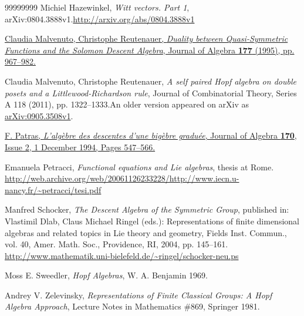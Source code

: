 \documentclass
[numbers=enddot,12pt,final,onecolumn,notitlepage,abstracton]{scrartcl}%
\theoremstyle{definition}
\begin{document}
\begin{thebibliography}{99999999}
Michiel Hazewinkel, \textit{Witt vectors. Part 1},
arXiv:0804.3888v1.\newline\url{http://arxiv.org/abs/0804.3888v1}

%
\href{https://doi.org/10.1006/jabr.1995.1336}{Claudia
Malvenuto, Christophe Reutenauer, \textit{Duality between Quasi-Symmetric
Functions and the Solomon Descent Algebra}, Journal of Algebra \textbf{177}
(1995), pp. 967--982.}

Claudia Malvenuto, Christophe Reutenauer,
\textit{A self paired Hopf algebra on double posets and a
Littlewood-Richardson rule}, Journal of Combinatorial Theory, Series A 118
(2011), pp. 1322--1333.\newline An older version appeared on arXiv as
\href{http://arxiv.org/abs/0905.3508v1}{arXiv:0905.3508v1}.

\href{https://doi.org/10.1006/jabr.1994.1352}{F.
Patras, \textit{L'alg\`{e}bre des descentes d'une big\`{e}bre gradu\'{e}e},
Journal of Algebra \textbf{170}, Issue 2, 1 December 1994, Pages 547--566.}

Emanuela Petracci, \textit{Functional equations and
Lie algebras}, thesis at Rome.\newline%
\url{http://web.archive.org/web/20061126233228/http://www.iecn.u-nancy.fr/~petracci/tesi.pdf}

Manfred Schocker, \textit{The Descent Algebra of
the Symmetric Group}, published in: Vlastimil Dlab, Claus Michael Ringel
(eds.): Representations of finite dimensional algebras and related topics in
Lie theory and geometry, Fields Inst. Commun., vol. 40, Amer. Math. Soc.,
Providence, RI, 2004, pp. 145--161.\newline%
\url{http://www.mathematik.uni-bielefeld.de/~ringel/schocker-neu.ps}

Moss E. Sweedler, \textit{Hopf Algebras}, W. A.
Benjamin 1969.

Andrey V. Zelevinsky, \textit{Representations of
Finite Classical Groups: A Hopf Algebra Approach}, Lecture Notes in
Mathematics \#869, Springer 1981.
\end{thebibliography}
\end{document}
